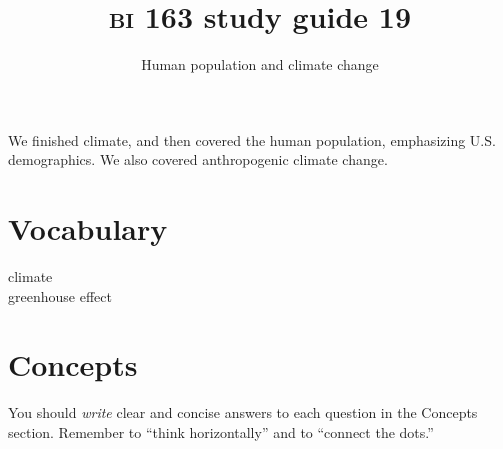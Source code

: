 \documentclass[letterpaper]{tufte-handout}
\title{{\scshape bi} 163 study guide 19}
\author{Human population and climate change }
\date{} %
\begin{document}
\maketitle	%

We finished climate, and then covered the human population, emphasizing U.S. demographics. We also covered anthropogenic climate change.

\section*{Vocabulary}

\vspace{-1\baselineskip}
\begin{multicols}{2}
climate \\
greenhouse effect
\end{multicols}

\section*{Concepts}

You should \emph{write} clear and concise answers to each question in the Concepts section.  Remember to ``think horizontally'' and to ``connect the dots.'' 
\end{document}
